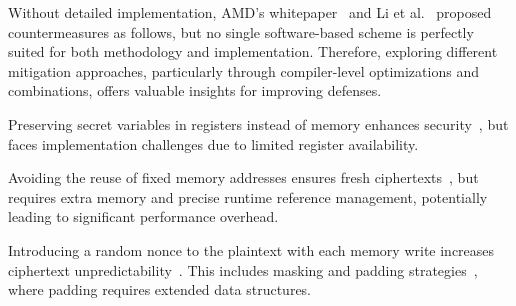 
Without detailed implementation, AMD's whitepaper~\cite{amdmeasures} and Li et al.~\cite{li2022systematic} proposed countermeasures as follows, but no single software-based scheme is perfectly suited for both methodology and implementation. 
Therefore, exploring different mitigation approaches, particularly through compiler-level optimizations and combinations, offers valuable insights for improving defenses.

\begin{packed_itemize}
\item[1)] Preserving secret variables in registers instead of memory enhances security~\cite{li2022systematic}, but faces implementation challenges due to limited register availability.

\item[2)] Avoiding the reuse of fixed memory addresses ensures fresh ciphertexts~\cite{li2022systematic, amdmeasures}, but requires extra memory and precise runtime reference management, potentially leading to significant performance overhead.

\item[3)] Introducing a random nonce to the plaintext with each memory write increases ciphertext unpredictability~\cite{li2022systematic}. This includes masking and padding strategies~\cite{amdmeasures}, where padding requires extended data structures.
\end{packed_itemize}
